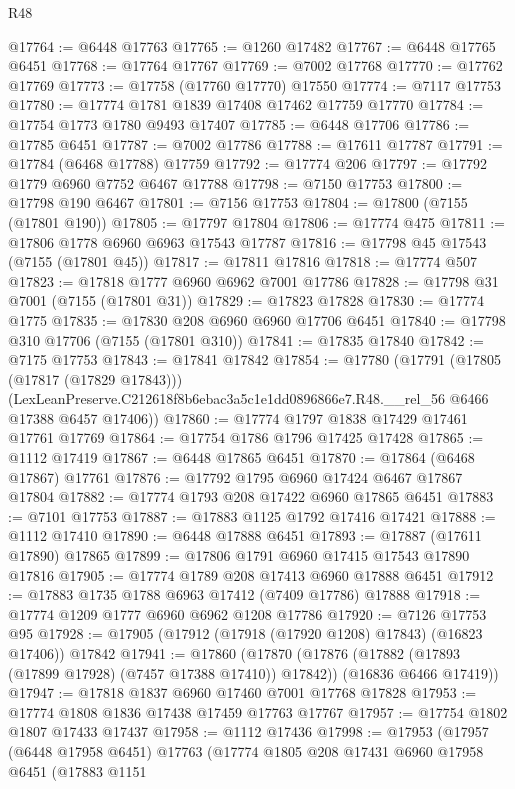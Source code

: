 \begin{lexlean}{R48}
\begin{coremodule}
@17764 := @6448 @17763
@17765 := @1260 @17482
@17767 := @6448 @17765 @6451
@17768 := @17764 @17767
@17769 := @7002 @17768
@17770 := @17762 @17769
@17773 := @17758 (@17760 @17770) @17550
@17774 := @7117 @17753
@17780 := @17774 @1781 @1839 @17408 @17462 @17759 @17770
@17784 := @17754 @1773 @1780 @9493 @17407
@17785 := @6448 @17706
@17786 := @17785 @6451
@17787 := @7002 @17786
@17788 := @17611 @17787
@17791 := @17784 (@6468 @17788) @17759
@17792 := @17774 @206
@17797 := @17792 @1779 @6960 @7752 @6467 @17788
@17798 := @7150 @17753
@17800 := @17798 @190 @6467
@17801 := @7156 @17753
@17804 := @17800 (@7155 (@17801 @190))
@17805 := @17797 @17804
@17806 := @17774 @475
@17811 := @17806 @1778 @6960 @6963 @17543 @17787
@17816 := @17798 @45 @17543 (@7155 (@17801 @45))
@17817 := @17811 @17816
@17818 := @17774 @507
@17823 := @17818 @1777 @6960 @6962 @7001 @17786
@17828 := @17798 @31 @7001 (@7155 (@17801 @31))
@17829 := @17823 @17828
@17830 := @17774 @1775
@17835 := @17830 @208 @6960 @6960 @17706 @6451
@17840 := @17798 @310 @17706 (@7155 (@17801 @310))
@17841 := @17835 @17840
@17842 := @7175 @17753
@17843 := @17841 @17842
@17854 := @17780
    (@17791
      (@17805 (@17817 (@17829 @17843)))
      (LexLeanPreserve.C212618f8b6ebac3a5c1e1dd0896866e7.R48.__rel_56 @6466 @17388 @6457 @17406))
@17860 := @17774 @1797 @1838 @17429 @17461 @17761 @17769
@17864 := @17754 @1786 @1796 @17425 @17428
@17865 := @1112 @17419
@17867 := @6448 @17865 @6451
@17870 := @17864 (@6468 @17867) @17761
@17876 := @17792 @1795 @6960 @17424 @6467 @17867 @17804
@17882 := @17774 @1793 @208 @17422 @6960 @17865 @6451
@17883 := @7101 @17753
@17887 := @17883 @1125 @1792 @17416 @17421
@17888 := @1112 @17410
@17890 := @6448 @17888 @6451
@17893 := @17887 (@17611 @17890) @17865
@17899 := @17806 @1791 @6960 @17415 @17543 @17890 @17816
@17905 := @17774 @1789 @208 @17413 @6960 @17888 @6451
@17912 := @17883 @1735 @1788 @6963 @17412 (@7409 @17786) @17888
@17918 := @17774 @1209 @1777 @6960 @6962 @1208 @17786
@17920 := @7126 @17753 @95
@17928 := @17905 (@17912 (@17918 (@17920 @1208) @17843) (@16823 @17406)) @17842
@17941 := @17860
    (@17870
      (@17876 (@17882 (@17893 (@17899 @17928) (@7457 @17388 @17410)) @17842))
      (@16836 @6466 @17419))
@17947 := @17818 @1837 @6960 @17460 @7001 @17768 @17828
@17953 := @17774 @1808 @1836 @17438 @17459 @17763 @17767
@17957 := @17754 @1802 @1807 @17433 @17437
@17958 := @1112 @17436
@17998 := @17953
    (@17957
      (@6448 @17958 @6451)
      @17763
      (@17774
        @1805
        @208
        @17431
        @6960
        @17958
        @6451
        (@17883
          @1151

\end{coremodule}
\end{lexlean}
